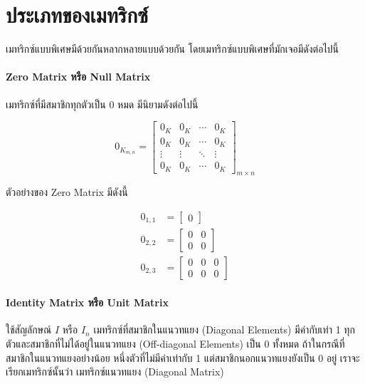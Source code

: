 \section{ประเภทของเมทริกซ์}
\label{sec:matrix_type}

เมทริกซ์แบบพิเศษมีด้วยกันหลากหลายแบบด้วยกัน โดยเมทริกซ์แบบพิเศษที่มักเจอมีดังต่อไปนี้

\paragraph{Zero Matrix หรือ Null Matrix} เมทริกซ์ที่มีสมาชิกทุกตัวเป็น 0 หมด มีนิยามดังต่อไปนี้

\begin{equation}
    0_{K_{m,n}} = 
    \begin{bmatrix}
        0_K & 0_K & \cdots & 0_K \\
        0_K & 0_K & \cdots & 0_K \\
        \vdots & \vdots & \ddots  & \vdots \\
        0_K & 0_K & \cdots & 0_K 
    \end{bmatrix}_{m \times n}
\end{equation}

\noindent ตัวอย่างของ Zero Matrix มีดังนี้

\begin{align}
    0_{1,1} &= \begin{bmatrix}
    0 \end{bmatrix}
    \\
    0_{2,2} &= \begin{bmatrix}
    0 & 0 \\
    0 & 0 \end{bmatrix}
    \\
    0_{2,3} &= \begin{bmatrix}
    0 & 0 & 0 \\
    0 & 0 & 0 \end{bmatrix}
\end{align}

\paragraph{Identity Matrix หรือ Unit Matrix} ใช้สัญลักษณ์ $I$ หรือ $I_{n}$ เมทริกซ์ที่สมาชิกในแนวทแยง (Diagonal Elements) 
มีค่ากับเท่า 1 ทุกตัวและสมาชิกที่ไม่ได้อยู่ในแนวทแยง (Off-diagonal Elements) เป็น 0 ทั้งหมด ถ้าในกรณีที่สมาชิกในแนวทแยงอย่างน้อย%
หนึ่งตัวที่ไม่มีค่าเท่ากับ 1 แต่สมาชิกนอกแนวทแยงยังเป็น 0 อยู่ เราจะเรียกเมทริกซ์นั้นว่า เมทริกซ์แนวทแยง (Diagonal Matrix)

